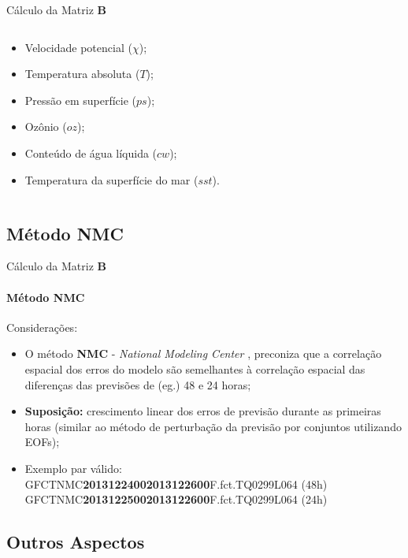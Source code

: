 \documentclass[10pt,aspectratio=169]{beamer}
\begin{document}
\begin{frame}[fragile]{Cálculo da Matriz $\mathbf{B}$}
\begin{columns}
\begin{column}{0.5\textwidth}
\begin{itemize}
        \item Velocidade potencial ($\chi$);
        \item Temperatura absoluta ($T$);
        \item Pressão em superfície ($ps$);
        \item Ozônio ($oz$);
        \item Conteúdo de água líquida ($cw$);
        \item Temperatura da superfície do mar ($sst$).
      \end{itemize}
    \end{column}
  \end{columns}
\end{frame}

\subsection{Método NMC}

\begin{frame}[fragile]{Cálculo da Matriz $\mathbf{B}$}
\framesubtitle{Método NMC}
  \begin{block}{Considerações:}
  \vspace{0.5em}
    \begin{itemize}
      \item O método \textbf{NMC} - \textit{National Modeling Center} \cite{parrishetal/1992}, preconiza que a correlação espacial dos erros do modelo são semelhantes à correlação espacial das diferenças das previsões de (eg.) 48 e 24 horas;
      \pause
      \item \textbf{Suposição:} crescimento linear dos erros de previsão durante as primeiras horas (similar ao método de perturbação da previsão por conjuntos utilizando EOFs);
      \pause
      \item Exemplo par válido: \\
      GFCTNMC\textcolor{laranjainpe}{\textbf{2013122400}}\textcolor{azulinpe}{\textbf{2013122600}}F.fct.TQ0299L064 (48h) \\
      GFCTNMC\textcolor{laranjainpe}{\textbf{2013122500}}\textcolor{azulinpe}{\textbf{2013122600}}F.fct.TQ0299L064 (24h)
    \end{itemize}
  \end{block}
\end{frame}

\subsection{Outros Aspectos}
\end{document}
